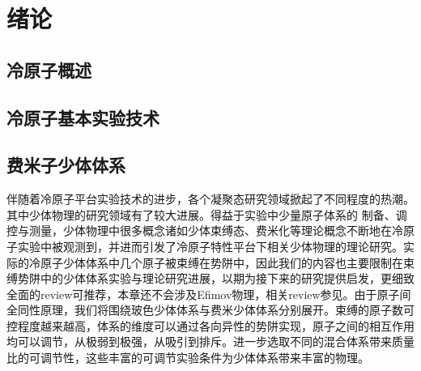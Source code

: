 \chapter{绪论}\label{chap:kondo}

\section{冷原子概述}

\section{冷原子基本实验技术}

\section{费米子少体体系}\label{sec:fewbody}
伴随着冷原子平台实验技术的进步，各个凝聚态研究领域掀起了不同程度的热潮。其中少体物理的研究领域有了较大进展。得益于实验中少量原子体系的
制备、调控与测量，少体物理中很多概念诸如少体束缚态、费米化等理论概念不断地在冷原子实验中被观测到，并进而引发了冷原子特性平台下相关少体物理的理论研究。实际的冷原子少体体系中几个原子被束缚在势阱中，因此我们的内容也主要限制在束缚势阱中的少体体系实验与理论研究进展，以期为接下来的研究提供启发，更细致全面的review可推荐\cite{sowinski2019one,blume2012few}，本章还不会涉及Efimov物理，相关review参见\cite{nielsen2001three,braaten2006universality,KohlerMolFRRMP}。由于原子间全同性原理，我们将围绕玻色少体体系与费米少体体系分别展开。束缚的原子数可控程度越来越高，体系的维度可以通过各向异性的势阱实现，原子之间的相互作用均可以调节，从极弱到极强，从吸引到排斥。进一步选取不同的混合体系带来质量比的可调节性，这些丰富的可调节实验条件为少体体系带来丰富的物理。


